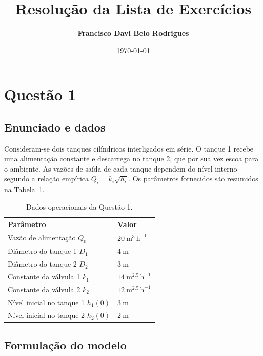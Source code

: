 \documentclass{article}
\title{Resolução da Lista de Exercícios}
\author{\textbf{Francisco Davi Belo Rodrigues}}
\date{\today}
\begin{document}
\fancyhead{}

\maketitle
\thispagestyle{fancy}

\section{Questão 1}

\subsection*{Enunciado e dados}
Consideram-se dois tanques cilíndricos interligados em série. O tanque 1 recebe uma alimentação constante e descarrega no tanque 2, que por sua vez escoa para o ambiente. As vazões de saída de cada tanque dependem do nível interno segundo a relação empírica $Q_i = k_i\sqrt{h_i}$. Os parâmetros fornecidos são resumidos na Tabela~\ref{tab:dados-q1}.

\begin{table}[ht]
  \centering
  \begin{tabular}{ll}
    \hline
    \textbf{Parâmetro} & \textbf{Valor} \\
    \hline
    Vazão de alimentação $Q_0$ & $20\ \mathrm{m^3\,h^{-1}}$ \\
    Diâmetro do tanque 1 $D_1$ & $4\ \mathrm{m}$ \\
    Diâmetro do tanque 2 $D_2$ & $3\ \mathrm{m}$ \\
    Constante da válvula 1 $k_1$ & $14\ \mathrm{m^{2.5}\,h^{-1}}$ \\
    Constante da válvula 2 $k_2$ & $12\ \mathrm{m^{2.5}\,h^{-1}}$ \\
    Nível inicial no tanque 1 $h_1(0)$ & $3\ \mathrm{m}$ \\
    Nível inicial no tanque 2 $h_2(0)$ & $2\ \mathrm{m}$ \\
    \hline
  \end{tabular}
  \caption{Dados operacionais da Questão 1.}
  \label{tab:dados-q1}
\end{table}

\subsection*{Formulação do modelo}
\end{document}
